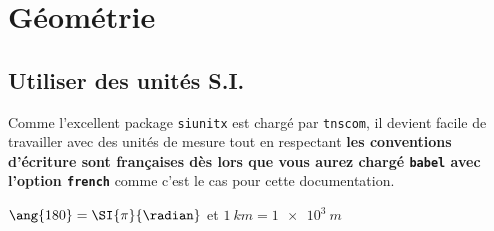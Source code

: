 \documentclass[12pt,a4paper]{article}
\begin{document}
\chapter{Géométrie}

\section{Utiliser des unités S.I.}

Comme l'excellent package \verb#siunitx# est chargé par \verb+tnscom+, il devient facile de travailler avec des unités de mesure tout en respectant \textbf{les conventions d'écriture sont françaises dès lors que vous aurez chargé \texttt{babel} avec l'option \texttt{french}} comme c'est le cas pour cette documentation.

\begin{latexex}
$\ang{180} = \SI{\pi}{\radian}$
et
$\SI{1}{km} = \SI{1e3}{m}$
\end{latexex}
\end{document}
